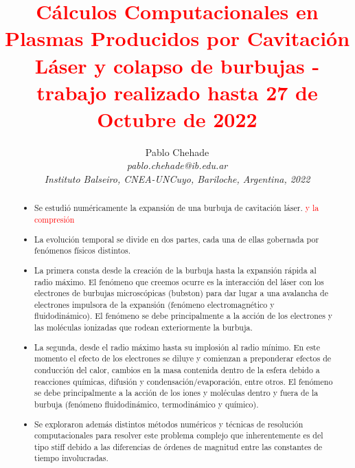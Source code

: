 \documentclass[aps,prb,twocolumn,superscriptaddress,floatfix,longbibliography,10pt]{revtex4-2}
\newcounter{para}
\begin{document}
\newcommand{\mytitle}{\textcolor{red}{Cálculos Computacionales en Plasmas Producidos por Cavitación Láser y colapso de burbujas - trabajo realizado hasta 27 de Octubre de 2022}}

\title{\mytitle}

\author{Pablo Chehade \\
    \small \textit{pablo.chehade@ib.edu.ar} \\
    \small \textit{Instituto Balseiro, CNEA-UNCuyo, Bariloche, Argentina, 2022} \\}


\begin{abstract}
  \begin{itemize}
    \item Se estudió numéricamente la expansión de una burbuja de cavitación láser. \textcolor{red}{y la compresión}
    \item La evolución temporal se divide en dos partes, cada una de ellas gobernada por fenómenos físicos distintos.
    \item La primera consta desde la creación de la burbuja hasta la expansión rápida al radio máximo. El fenómeno que creemos ocurre es la interacción del láser con los electrones de burbujas microscópicas (bubston) para dar lugar a una avalancha de electrones impulsora de la expansión (fenómeno electromagnético y fluidodinámico). El fenómeno se debe principalmente a la acción de los electrones y las moléculas ionizadas que rodean exteriormente la burbuja.
    \item La segunda, desde el radio máximo hasta su implosión al radio mínimo. En este momento el efecto de los electrones se diluye y comienzan a preponderar efectos de conducción del calor, cambios en la masa contenida dentro de la esfera debido a reacciones químicas, difusión y condensación/evaporación, entre otros. El fenómeno se debe principalmente a la acción de los iones y moléculas dentro y fuera de la burbuja (fenómeno fluidodinámico, termodinámico y químico).
    \item Se exploraron además distintos métodos numéricos y técnicas de resolución computacionales para resolver este problema complejo que inherentemente es del tipo stiff debido a las diferencias de órdenes de magnitud entre las constantes de tiempo involucradas.
  \end{itemize}


\end{abstract}

\maketitle
\end{document}
